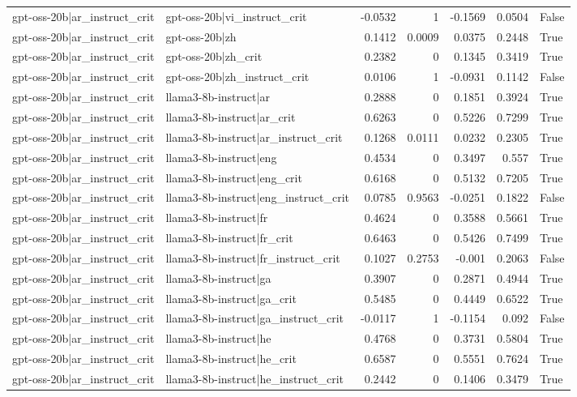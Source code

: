 \begin{table}
\begin{tabular}{l l r r r r l}
gpt-oss-20b|ar_instruct_crit & gpt-oss-20b|vi_instruct_crit & -0.0532 & 1 & -0.1569 & 0.0504 & False \\
gpt-oss-20b|ar_instruct_crit & gpt-oss-20b|zh & 0.1412 & 0.0009 & 0.0375 & 0.2448 & True \\
gpt-oss-20b|ar_instruct_crit & gpt-oss-20b|zh_crit & 0.2382 & 0 & 0.1345 & 0.3419 & True \\
gpt-oss-20b|ar_instruct_crit & gpt-oss-20b|zh_instruct_crit & 0.0106 & 1 & -0.0931 & 0.1142 & False \\
gpt-oss-20b|ar_instruct_crit & llama3-8b-instruct|ar & 0.2888 & 0 & 0.1851 & 0.3924 & True \\
gpt-oss-20b|ar_instruct_crit & llama3-8b-instruct|ar_crit & 0.6263 & 0 & 0.5226 & 0.7299 & True \\
gpt-oss-20b|ar_instruct_crit & llama3-8b-instruct|ar_instruct_crit & 0.1268 & 0.0111 & 0.0232 & 0.2305 & True \\
gpt-oss-20b|ar_instruct_crit & llama3-8b-instruct|eng & 0.4534 & 0 & 0.3497 & 0.557 & True \\
gpt-oss-20b|ar_instruct_crit & llama3-8b-instruct|eng_crit & 0.6168 & 0 & 0.5132 & 0.7205 & True \\
gpt-oss-20b|ar_instruct_crit & llama3-8b-instruct|eng_instruct_crit & 0.0785 & 0.9563 & -0.0251 & 0.1822 & False \\
gpt-oss-20b|ar_instruct_crit & llama3-8b-instruct|fr & 0.4624 & 0 & 0.3588 & 0.5661 & True \\
gpt-oss-20b|ar_instruct_crit & llama3-8b-instruct|fr_crit & 0.6463 & 0 & 0.5426 & 0.7499 & True \\
gpt-oss-20b|ar_instruct_crit & llama3-8b-instruct|fr_instruct_crit & 0.1027 & 0.2753 & -0.001 & 0.2063 & False \\
gpt-oss-20b|ar_instruct_crit & llama3-8b-instruct|ga & 0.3907 & 0 & 0.2871 & 0.4944 & True \\
gpt-oss-20b|ar_instruct_crit & llama3-8b-instruct|ga_crit & 0.5485 & 0 & 0.4449 & 0.6522 & True \\
gpt-oss-20b|ar_instruct_crit & llama3-8b-instruct|ga_instruct_crit & -0.0117 & 1 & -0.1154 & 0.092 & False \\
gpt-oss-20b|ar_instruct_crit & llama3-8b-instruct|he & 0.4768 & 0 & 0.3731 & 0.5804 & True \\
gpt-oss-20b|ar_instruct_crit & llama3-8b-instruct|he_crit & 0.6587 & 0 & 0.5551 & 0.7624 & True \\
gpt-oss-20b|ar_instruct_crit & llama3-8b-instruct|he_instruct_crit & 0.2442 & 0 & 0.1406 & 0.3479 & True \\

\end{tabular}
\end{table}
